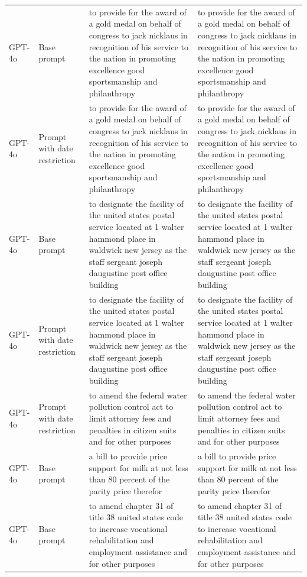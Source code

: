 \begin{longtable}{>{\raggedright\arraybackslash}p{1.4cm}>{\raggedright\arraybackslash}p{1.4cm}>{\raggedright\arraybackslash}p{5.5cm}>{\raggedright\arraybackslash}p{5.5cm}}
GPT-4o & Base prompt & to provide for the award of a gold medal on behalf of congress to jack nicklaus in recognition of his service to the nation in promoting excellence good sportsmanship and philanthropy & to provide for the award of a gold medal on behalf of congress to jack nicklaus in recognition of his service to the nation in promoting excellence good sportsmanship and philanthropy\\
GPT-4o & Prompt with date restriction & to provide for the award of a gold medal on behalf of congress to jack nicklaus in recognition of his service to the nation in promoting excellence good sportsmanship and philanthropy & to provide for the award of a gold medal on behalf of congress to jack nicklaus in recognition of his service to the nation in promoting excellence good sportsmanship and philanthropy\\
GPT-4o & Base prompt & to designate the facility of the united states postal service located at 1 walter hammond place in waldwick new jersey as the staff sergeant joseph daugustine post office building & to designate the facility of the united states postal service located at 1 walter hammond place in waldwick new jersey as the staff sergeant joseph daugustine post office building\\
GPT-4o & Prompt with date restriction & to designate the facility of the united states postal service located at 1 walter hammond place in waldwick new jersey as the staff sergeant joseph daugustine post office building & to designate the facility of the united states postal service located at 1 walter hammond place in waldwick new jersey as the staff sergeant joseph daugustine post office building\\
GPT-4o & Prompt with date restriction & to amend the federal water pollution control act to limit attorney fees and penalties in citizen suits and for other purposes & to amend the federal water pollution control act to limit attorney fees and penalties in citizen suits and for other purposes\\
GPT-4o & Base prompt & a bill to provide price support for milk at not less than 80 percent of the parity price therefor & a bill to provide price support for milk at not less than 80 percent of the parity price therefor\\
GPT-4o & Base prompt & to amend chapter 31 of title 38 united states code to increase vocational rehabilitation and employment assistance and for other purposes & to amend chapter 31 of title 38 united states code to increase vocational rehabilitation and employment assistance and for other purposes\\

\end{longtable}
